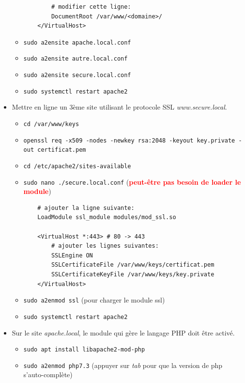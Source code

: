 \documentclass[a4paper]{article}
\begin{document}
\begin{itemize}
\begin{example}
\begin{itemize}
\begin{verbatim}
        # modifier cette ligne:
        DocumentRoot /var/www/<domaine>/
    </VirtualHost>
        \end{verbatim}
        \item \texttt{sudo a2ensite apache.local.conf}
        \item \texttt{sudo a2ensite autre.local.conf}
        \item \texttt{sudo a2ensite secure.local.conf}
        \item \texttt{sudo systemctl restart apache2}
    \end{itemize}
\end{example}

\item Mettre en ligne un 3ème site utilisant le protocole SSL \textit{www.secure.local}.
\begin{example}
    \begin{itemize}
        \item \texttt{cd /var/www/keys}
        \item \texttt{openssl req -x509 -nodes -newkey rsa:2048 -keyout key.private -out certificat.pem}
        \item \texttt{cd /etc/apache2/sites-available}
        \item \texttt{sudo nano ./secure.local.conf} (\textcolor{red}{\textbf{peut-être pas besoin de loader le module}})
        \begin{verbatim}
    # ajouter la ligne suivante:
    LoadModule ssl_module modules/mod_ssl.so

    <VirtualHost *:443> # 80 -> 443
        # ajouter les lignes suivantes:
        SSLEngine ON
        SSLCertificateFile /var/www/keys/certificat.pem
        SSLCertificateKeyFile /var/www/keys/key.private
    </VirtualHost>
        \end{verbatim}
        \item \texttt{sudo a2enmod ssl} (pour charger le module ssl)
        \item \texttt{sudo systemctl restart apache2}
    \end{itemize}
\end{example}

\item Sur le site \textit{apache.local}, le module qui gère le langage PHP doit être activé.
\begin{example}
    \begin{itemize}
        \item \texttt{sudo apt install libapache2-mod-php}
        \item \texttt{sudo a2enmod php7.3} (appuyer sur \textit{tab} pour que la version de php s'auto-complète)
    \end{itemize}
\end{example}


\end{itemize}
\end{document}
